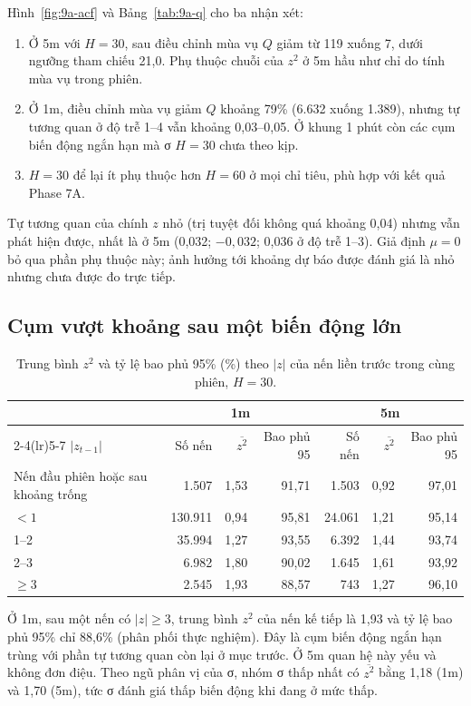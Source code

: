 \documentclass[11pt,a4paper]{article}
\begin{document}
Hình~\ref{fig:9a-acf} và Bảng~\ref{tab:9a-q} cho ba nhận xét:
\begin{enumerate}[nosep]
\item Ở 5m với $H=30$, sau điều chỉnh mùa vụ $Q$ giảm từ 119 xuống 7, dưới ngưỡng tham chiếu 21,0. Phụ thuộc chuỗi của $z^2$ ở 5m hầu như chỉ do tính mùa vụ trong phiên.
\item Ở 1m, điều chỉnh mùa vụ giảm $Q$ khoảng 79\% (6.632 xuống 1.389), nhưng tự tương quan ở độ trễ 1--4 vẫn khoảng 0,03--0,05. Ở khung 1 phút còn các cụm biến động ngắn hạn mà σ $H=30$ chưa theo kịp.
\item $H=30$ để lại ít phụ thuộc hơn $H=60$ ở mọi chỉ tiêu, phù hợp với kết quả Phase 7A.
\end{enumerate}

Tự tương quan của chính $z$ nhỏ (trị tuyệt đối không quá khoảng 0,04) nhưng vẫn phát hiện được, nhất là ở 5m (0,032; $-0{,}032$; 0,036 ở độ trễ 1--3). Giả định $\mu=0$ bỏ qua phần phụ thuộc này; ảnh hưởng tới khoảng dự báo được đánh giá là nhỏ nhưng chưa được đo trực tiếp.

\subsection{Cụm vượt khoảng sau một biến động lớn}

\begin{table}[h]
\centering
\small
\caption{Trung bình $z^2$ và tỷ lệ bao phủ 95\% (\%) theo $|z|$ của nến liền trước trong cùng phiên, $H=30$.}
\label{tab:9a-tre}
\begin{tabular}{lrrrrrr}
\toprule
& \multicolumn{3}{c}{1m} & \multicolumn{3}{c}{5m} \\
\cmidrule(lr){2-4}\cmidrule(lr){5-7}
$|z_{t-1}|$ & Số nến & $\overline{z^2}$ & Bao phủ 95 & Số nến & $\overline{z^2}$ & Bao phủ 95 \\
\midrule
Nến đầu phiên hoặc sau khoảng trống & 1.507 & 1,53 & 91,71 & 1.503 & 0,92 & 97,01 \\
$<1$ & 130.911 & 0,94 & 95,81 & 24.061 & 1,21 & 95,14 \\
1--2 & 35.994 & 1,27 & 93,55 & 6.392 & 1,44 & 93,74 \\
2--3 & 6.982 & 1,80 & 90,02 & 1.645 & 1,61 & 93,92 \\
$\geq3$ & 2.545 & 1,93 & 88,57 & 743 & 1,27 & 96,10 \\
\bottomrule
\end{tabular}
\end{table}

Ở 1m, sau một nến có $|z|\geq3$, trung bình $z^2$ của nến kế tiếp là 1,93 và tỷ lệ bao phủ 95\% chỉ 88,6\% (phân phối thực nghiệm). Đây là cụm biến động ngắn hạn trùng với phần tự tương quan còn lại ở mục trước. Ở 5m quan hệ này yếu và không đơn điệu. Theo ngũ phân vị của σ, nhóm σ thấp nhất có $\overline{z^2}$ bằng 1,18 (1m) và 1,70 (5m), tức σ đánh giá thấp biến động khi đang ở mức thấp.
\end{document}
